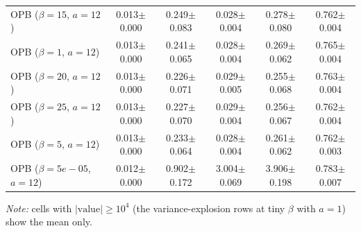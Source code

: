 \begin{table}[t]
{\begin{tabular}{l c c c c c}
OPB ($\beta=15$, $a=12$) & 0.013$\pm$0.000 & 0.249$\pm$0.083 & 0.028$\pm$0.004 & 0.278$\pm$0.080 & 0.762$\pm$0.004 \\
OPB ($\beta=1$, $a=12$) & 0.013$\pm$0.000 & 0.241$\pm$0.065 & 0.028$\pm$0.004 & 0.269$\pm$0.062 & 0.765$\pm$0.004 \\
OPB ($\beta=20$, $a=12$) & 0.013$\pm$0.000 & 0.226$\pm$0.071 & 0.029$\pm$0.005 & 0.255$\pm$0.068 & 0.763$\pm$0.004 \\
OPB ($\beta=25$, $a=12$) & 0.013$\pm$0.000 & 0.227$\pm$0.070 & 0.029$\pm$0.004 & 0.256$\pm$0.067 & 0.762$\pm$0.004 \\
OPB ($\beta=5$, $a=12$) & 0.013$\pm$0.000 & 0.233$\pm$0.064 & 0.028$\pm$0.004 & 0.261$\pm$0.062 & 0.762$\pm$0.003 \\
OPB ($\beta=5e-05$, $a=12$) & 0.012$\pm$0.000 & 0.902$\pm$0.172 & 3.004$\pm$0.069 & 3.906$\pm$0.198 & 0.783$\pm$0.007 \\
\hline
\end{tabular}
}
\end{table}
\par\smallskip\textit{Note:} cells with $|\mathrm{value}| \ge 10^4$ (the variance-explosion rows at tiny $\beta$ with $a=1$) show the mean only.
